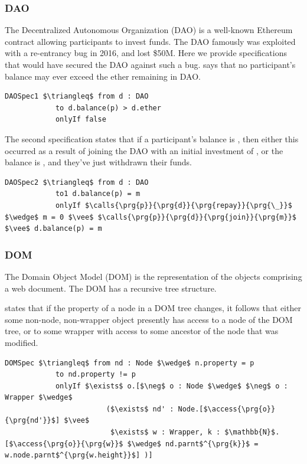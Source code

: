\subsubsection{DAO}
The Decentralized Autonomous Organization (DAO) is a well-known Ethereum contract allowing 
participants to invest funds. The DAO famously was exploited with a re-entrancy bug in 2016, 
and lost \$50M. Here we provide specifications that would have secured the DAO against such a 
bug.  says that no participant's balance may ever exceed the ether remaining 
in DAO.
\begin{lstlisting}[language = Chainmail, mathescape=true, frame=lines]
DAOSpec1 $\triangleq$ from d : DAO
            to d.balance(p) > d.ether
            onlyIf false
\end{lstlisting}
The second specification  states that if a participant's balance is , then 
either this occurred as a result of joining the DAO with an initial investment of , or the
balance is , and they've just withdrawn their funds.
\begin{lstlisting}[language = Chainmail, mathescape=true, frame=lines]
DAOSpec2 $\triangleq$ from d : DAO
            to1 d.balance(p) = m
            onlyIf $\calls{\prg{p}}{\prg{d}}{\prg{repay}}{\prg{\_}}$ $\wedge$ m = 0 $\vee$ $\calls{\prg{p}}{\prg{d}}{\prg{join}}{\prg{m}}$ $\vee$ d.balance(p) = m
\end{lstlisting}

\subsubsection{DOM}
The Domain Object Model (DOM) is the representation of the objects comprising a web document.
The DOM has a recursive tree structure.

 states that if the property of a node in a DOM tree changes,
it follows that either some non-node, non-wrapper object presently has 
access to a node of the DOM tree, or to some wrapper with access to some 
ancestor of the node that was modified.
\begin{lstlisting}[language = Chainmail, mathescape=true, frame=lines]
DOMSpec $\triangleq$ from nd : Node $\wedge$ n.property = p
            to nd.property != p
            onlyIf $\exists$ o.[$\neg$ o : Node $\wedge$ $\neg$ o : Wrapper $\wedge$ 
                        ($\exists$ nd' : Node.[$\access{\prg{o}}{\prg{nd'}}$] $\vee$ 
                         $\exists$ w : Wrapper, k : $\mathbb{N}$.[$\access{\prg{o}}{\prg{w}}$ $\wedge$ nd.parnt$^{\prg{k}}$ = w.node.parnt$^{\prg{w.height}}$] )]
\end{lstlisting}
